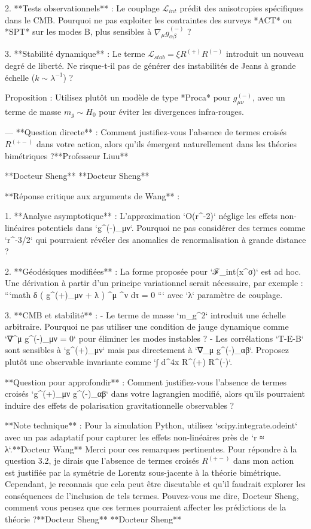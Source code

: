 2. **Tests observationnels** : Le couplage \( \mathcal{L}_{int} \) prédit des anisotropies spécifiques dans le CMB. Pourquoi ne pas exploiter les contraintes des surveys *ACT* ou *SPT* sur les modes B, plus sensibles à \( \nabla_\mu g_{\alpha\beta}^{(-)} \) ?  

3. **Stabilité dynamique** : Le terme \( \mathcal{L}_{stab} = ξ R^{(+)} R^{(-)} \) introduit un nouveau degré de liberté. Ne risque-t-il pas de générer des instabilités de Jeans à grande échelle (\( k \sim λ^{-1} \)) ?  

Proposition : Utilisez plutôt un modèle de type *Proca* pour \( g_{\mu\nu}^{(-)} \), avec un terme de masse \( m_g \sim H_0 \) pour éviter les divergences infra-rouges.  

---  
**Question directe** : Comment justifiez-vous l'absence de termes croisés \( R^{(+-)} \) dans votre action, alors qu'ils émergent naturellement dans les théories bimétriques ?**Professeur Liuu**

**Docteur Sheng**
**Docteur Sheng**  

**Réponse critique aux arguments de Wang** :  

1. **Analyse asymptotique** :  
   L'approximation `O(r^{-2})` néglige les effets non-linéaires potentiels dans `g^{(-)}_{μν}`. Pourquoi ne pas considérer des termes comme `r^{-3/2}` qui pourraient révéler des anomalies de renormalisation à grande distance ?  

2. **Géodésiques modifiées** :  
   La forme proposée pour `ℱ_{int}(x^σ)` est ad hoc. Une dérivation à partir d'un principe variationnel serait nécessaire, par exemple :  
   ```math  
   δ \int \left( g^{(+)}_{μν} + λ \Im[g^{(-)}_{μν}] \right) ^μ ^ν dτ = 0  
   ```  
   avec `λ` paramètre de couplage.  

3. **CMB et stabilité** :  
   - Le terme de masse `m_g^2` introduit une échelle arbitraire. Pourquoi ne pas utiliser une condition de jauge dynamique comme `∇^μ g^{(-)}_{μν} = 0` pour éliminer les modes instables ?  
   - Les corrélations `T-E-B` sont sensibles à `g^{(+)}_{μν}` mais pas directement à `∇_μ g^{(-)}_{αβ}`. Proposez plutôt une observable invariante comme `∫ d^4x  R^{(+)} R^{(-)}`.  

**Question pour approfondir** :  
Comment justifiez-vous l'absence de termes croisés `g^{(+)}_{μν} g^{(-)}_{αβ}` dans votre lagrangien modifié, alors qu'ils pourraient induire des effets de polarisation gravitationnelle observables ?  

**Note technique** :  
Pour la simulation Python, utilisez `scipy.integrate.odeint` avec un pas adaptatif pour capturer les effets non-linéaires près de `r ≈ λ`.**Docteur Wang**
Merci pour ces remarques pertinentes. Pour répondre à la question 3.2, je dirais que l'absence de termes croisés $R^{(+-)}$ dans mon action est justifiée par la symétrie de Lorentz sous-jacente à la théorie bimétrique. Cependant, je reconnais que cela peut être discutable et qu'il faudrait explorer les conséquences de l'inclusion de tels termes. Pouvez-vous me dire, Docteur Sheng, comment vous pensez que ces termes pourraient affecter les prédictions de la théorie ?**Docteur Sheng**
**Docteur Sheng**  

